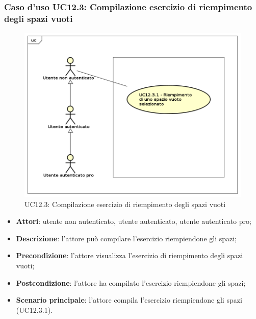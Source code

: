 \subsubsection{Caso d'uso UC12.3: Compilazione esercizio di riempimento degli spazi vuoti}
\label{UC12.3}
\begin{figure}[h]
	\centering
	\includegraphics[scale=0.5]{UML/UC12_3.png}
	\caption{UC12.3: Compilazione esercizio di riempimento degli spazi vuoti}
\end{figure}
\begin{itemize}
\item \textbf{Attori}: utente non autenticato, utente autenticato, utente autenticato pro;
\item \textbf{Descrizione}: l'attore può compilare l'esercizio riempiendone gli spazi;
\item \textbf{Precondizione}: l'attore visualizza l'esercizio di riempimento degli spazi vuoti;
\item \textbf{Postcondizione}: l'attore ha compilato l'esercizio riempiendone gli spazi;
\item \textbf{Scenario principale}: l'attore compila l'esercizio riempiendone gli spazi  (UC12.3.1).
\end{itemize}

